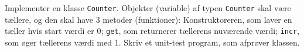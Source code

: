 Implementer en klasse \texttt{Counter}. Objekter (variable) af typen \texttt{Counter} skal være tællere, og den skal have 3 metoder (funktioner): Konstruktoreren, som laver en tæller hvis start værdi er 0; \texttt{get}, som returnerer tællerens nuværende værdi; \texttt{incr}, som øger tællerens værdi med 1. Skriv et unit-test program, som afprøver klassen.
